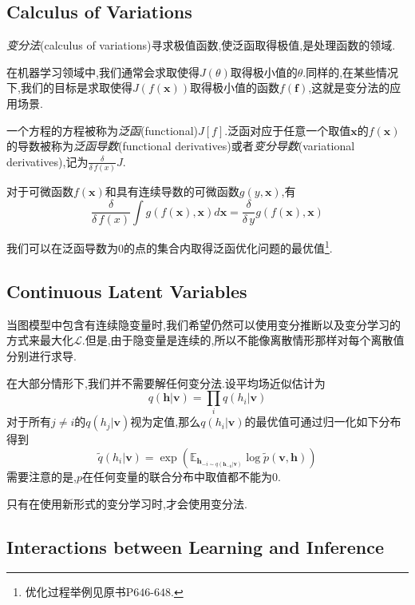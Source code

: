 \subsection{Calculus of Variations}

\textit{变分法}(calculus of variations)寻求极值函数,使泛函取得极值,是处理函数的领域.

在机器学习领域中,我们通常会求取使得$J(\theta)$取得极小值的$\theta$.同样的,在某些情况下,我们的目标是求取使得$J(f(\mathbf x))$取得极小值的函数$f(\mathbf f)$,这就是变分法的应用场景.

一个方程的方程被称为\textit{泛函}(functional)$J[f]$.泛函对应于任意一个取值$\mathbf x$的$f(\mathbf x)$的导数被称为\textit{泛函导数}(functional derivatives)或者\textit{变分导数}(variational derivatives),记为$\frac{\delta}{\delta\,f(x)}J$.

对于可微函数$f(\mathbf x)$和具有连续导数的可微函数$g(y,\mathbf x)$,有
\begin{equation}
\frac{\delta}{\delta\,f(x)}\int g(f(\mathbf x),\mathbf x)d\mathbf x=\frac{\delta}{\delta\,y}g(f(\mathbf x),\mathbf x)
\end{equation}

我们可以在泛函导数为$0$的点的集合内取得泛函优化问题的最优值\footnote{优化过程举例见原书P$646$-$648$.}.

\subsection{Continuous Latent Variables}

当图模型中包含有连续隐变量时,我们希望仍然可以使用变分推断以及变分学习的方式来最大化$\mathcal L$.但是,由于隐变量是连续的,所以不能像离散情形那样对每个离散值分别进行求导.

在大部分情形下,我们并不需要解任何变分法.设平均场近似估计为
\begin{equation}
q(\mathbf{h|v})=\prod_iq(h_i|\mathbf v)
\end{equation}
对于所有$j\ne i$的$q(h_j|\mathbf v)$视为定值,那么$q(h_i|\mathbf v)$的最优值可通过归一化如下分布得到
\begin{equation}
\tilde q(h_i|\mathbf v)=\exp(\mathbb E_{\mathbf h_{-i\sim q(\mathbf{h_{-1}|v})}}\log\tilde p(\mathbf{v,h}))
\end{equation}
需要注意的是,$p$在任何变量的联合分布中取值都不能为$0$.

只有在使用新形式的变分学习时,才会使用变分法.

\subsection{Interactions between Learning and Inference}